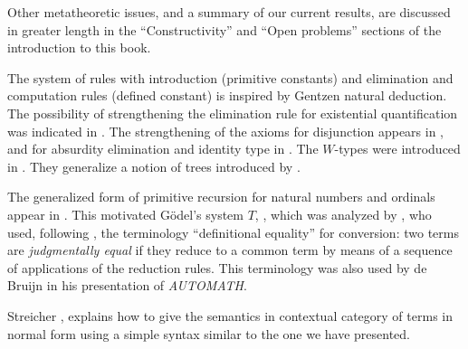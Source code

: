 Other metatheoretic issues, and a summary of our current results, are discussed
in greater length in the ``Constructivity'' and ``Open problems'' sections of
the introduction to this book.

\sectionNotes\label{subsec:general-remarks}


The system of rules with introduction (primitive constants) and elimination
and computation rules (defined constant) is inspired by Gentzen natural
deduction. The possibility of strengthening the elimination rule for
existential quantification was indicated in \cite{howard:pat}. The
strengthening of the axioms for disjunction appears in \cite{Martin-Lof-1972},
and for absurdity elimination and identity type in \cite{Martin-Lof-1973}. The
$W$-types were introduced in \cite{Martin-Lof-1979}. They generalize a notion
of trees introduced by \cite{Tait-1968}.

The generalized form of primitive recursion for natural numbers and ordinals
appear in \cite{Hilbert-1925}. This motivated G\"odel's system $T$,
\cite{Goedel-T-1958}, which was analyzed by \cite{Tait-1966}, who used,
following \cite{Goedel-T-1958}, the terminology ``definitional equality'' for
conversion: two terms are \emph{judgmentally equal} if they reduce to a
common term by means of a sequence of applications of the reduction
rules. This terminology was also used by de Bruijn \cite{deBruijn-1973} in his
presentation of \emph{AUTOMATH}.

Streicher \cite[Theorem 4.13]{Streicher-1991}, explains how to give the
semantics in contextual category of terms in normal form using a simple syntax
similar to the one we have presented.

